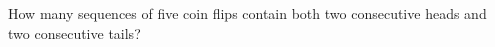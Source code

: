 How many sequences of five coin flips contain both two consecutive heads and two consecutive tails?
